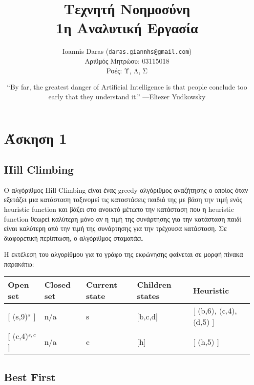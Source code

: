 \documentclass[a4paper,oneside, 11pt]{article}
\title{\textbf{Τεχνητή Νοημοσύνη \\ 1η Αναλυτική Εργασία}}
\author{ Ioannis Daras (\texttt{daras.giannhs@gmail.com}) \\
Αριθμός Μητρώου: 03115018 \\
Ροές: Υ, Λ, Σ 
}
\date{“By far, the greatest danger of Artificial Intelligence is that people conclude too early that they understand it.” —Eliezer Yudkowsky}
\begin{document}
\maketitle
\noindent\makebox[\linewidth]{\rule{0.8\paperwidth}{0.4pt}}

\section*{Άσκηση 1}

\subsection*{Hill Climbing}
Ο αλγόριθμος Hill Climbing είναι ένας greedy αλγόριθμος αναζήτησης ο οποίος όταν εξετάζει μια κατάσταση ταξινομεί τις καταστάσεις παιδιά της με βάση την τιμή ενός heuristic function και βάζει στο ανοικτό μέτωπο την κατάσταση που η heuristic function θεωρεί καλύτερη μόνο αν η τιμή της συνάρτησης για την κατάσταση παιδί είναι καλύτερη από την τιμή της συνάρτησης για την τρέχουσα κατάσταση. Σε διαφορετική περίπτωση, ο αλγόριθμος σταματάει.


Η εκτέλεση του αλγορίθμου για το γράφο της εκφώνησης φαίνεται σε μορφή πίνακα παρακάτω:

\bigbreak
\begin{adjustbox}{width=\textwidth,center=\textwidth}
\begin{tabular}{lllll}
	\hline
	\multicolumn{1}{|l|}{Open set} & \multicolumn{1}{l|}{Closed set} & \multicolumn{1}{l|}{Current state} & \multicolumn{1}{l|}{Children states} & \multicolumn{1}{l|}{Heuristic} \\ \hline
	{[} (s,9)$^s$ {]}                                   & n/a                                              & s                                                       & {[}b,c,d{]}                                            & {[} (b,6), (c,4), (d,5) {]}             \\
	{[} (c,4)$^{s,c}$ {]}                                   & n/a                                              & c                                                       & {[}h{]}                                                & {[} (h,5) {]}                          
\end{tabular}
\end{adjustbox}
\bigbreak

\subsection*{Best First}
\end{document}
